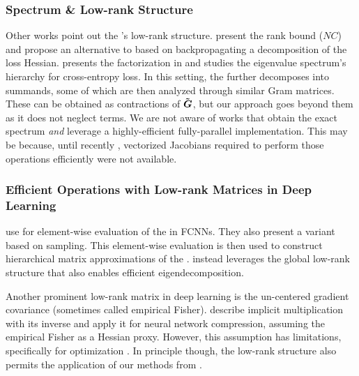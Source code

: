 \subsubsection{\ggn Spectrum \& Low-rank Structure}

Other works point out the \ggn's low-rank structure. \citet{botev2017practical}
present the rank bound ($NC$) and propose an alternative to \kfac based on
backpropagating a decomposition of the loss Hessian.
\citet{papyan2019measurements} presents the factorization in
 and studies the eigenvalue spectrum's
hierarchy for cross-entropy loss. In this setting, the \ggn further decomposes
into summands, some of which are then analyzed through similar Gram matrices.
These can be obtained as contractions of $\bm{\tilde{{\bm{G}}}}$, but our approach goes
beyond them as it does not neglect terms. We are not aware of works that obtain
the exact spectrum \emph{and} leverage a highly-efficient fully-parallel
implementation. This may be because, until recently \citep{bradbury2018jax,
  dangel2020backpack}, vectorized Jacobians required to perform those operations
efficiently were not available.

\subsubsection{Efficient Operations with Low-rank Matrices in Deep Learning}

\citet{chen2021fast} use  for element-wise
evaluation of the \ggn in FCNNs. They also present a variant based on \mc
sampling. This element-wise evaluation is then used to construct hierarchical
matrix approximations of the \ggn. \vivit instead leverages the global low-rank
structure that also enables efficient eigendecomposition.

Another prominent low-rank matrix in deep learning is the un-centered gradient
covariance (sometimes called empirical Fisher). \citet{singh2020woodfisher}
describe implicit multiplication with its inverse and apply it for neural
network compression, assuming the empirical Fisher as a Hessian proxy. However,
this assumption has limitations, specifically for optimization
\citep{kunstner2019limitations}. In principle though, the low-rank structure
also permits the application of our methods from .

